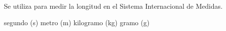 
\question Se utiliza para medir la longitud en el Sistema Internacional de
Medidas.

  \begin{oneparchoices}
    \choice segundo (s)
    \CorrectChoice metro (m)
    \choice kilogramo (kg)
    \choice gramo (g)
  \end{oneparchoices}
  \answerline[B]
